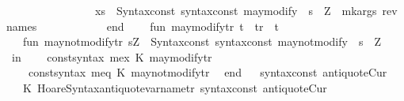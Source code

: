 \begin{isabellebody}
\ \ \ \ \ \ \ \ \ \ \ \ \ \ \ \ {\isacharbar}\ xs\ {\isacharequal}{\isachargreater}\ Syntax{\isachardot}const\ {\isacharat}{\isacharbraceleft}syntax{\isacharunderscore}const\ {\isachardoublequote}{\isacharunderscore}may{\isacharunderscore}modify{\isachardoublequote}{\isacharbraceright}\ {\isachardollar}\ s\ {\isachardollar}\ Z\ {\isachardollar}\ mk{\isacharunderscore}args\ {\isacharparenleft}rev\ names{\isacharparenright}{\isacharparenright}\isanewline
\ \ \ \ \ \ \ \ \ \ \ \ end{\isacharsemicolon}\isanewline
\isanewline
\ \ \ \ fun\ may{\isacharunderscore}modify{\isacharunderscore}tr{\isacharprime}\ {\isacharbrackleft}t{\isacharbrackright}\ {\isacharequal}\ tr{\isacharprime}\ {\isacharbrackleft}{\isacharbrackright}\ t\isanewline
\ \ \ \ fun\ may{\isacharunderscore}not{\isacharunderscore}modify{\isacharunderscore}tr{\isacharprime}\ {\isacharbrackleft}{\isacharunderscore}{\isachardollar}s{\isacharcomma}{\isacharunderscore}{\isachardollar}Z{\isacharbrackright}\ {\isacharequal}\ Syntax{\isachardot}const\ {\isacharat}{\isacharbraceleft}syntax{\isacharunderscore}const\ {\isachardoublequote}{\isacharunderscore}may{\isacharunderscore}not{\isacharunderscore}modify{\isachardoublequote}{\isacharbraceright}\ {\isachardollar}\ s\ {\isachardollar}\ Z\isanewline
\ \ in\isanewline
\ \ \ \ {\isacharbrackleft}{\isacharparenleft}{\isacharat}{\isacharbraceleft}const{\isacharunderscore}syntax\ mex{\isacharbraceright}{\isacharcomma}\ K\ may{\isacharunderscore}modify{\isacharunderscore}tr{\isacharprime}{\isacharparenright}{\isacharcomma}\isanewline
\ \ \ \ \ {\isacharparenleft}{\isacharat}{\isacharbraceleft}const{\isacharunderscore}syntax\ meq{\isacharbraceright}{\isacharcomma}\ K\ may{\isacharunderscore}not{\isacharunderscore}modify{\isacharunderscore}tr{\isacharprime}{\isacharparenright}{\isacharbrackright}\isanewline
\ \ end{\isacharsemicolon}\isanewline
{\isacartoucheclose}\isanewline
\isanewline
\isanewline
\isanewline
\isanewline
\isanewline
\isanewline
\isanewline
{}\isamarkupfalse%
\ {\isacartoucheopen}\isanewline
\ {\isacharbrackleft}{\isacharparenleft}{\isacharat}{\isacharbraceleft}syntax{\isacharunderscore}const\ {\isachardoublequote}{\isacharunderscore}antiquoteCur{\isachardoublequote}{\isacharbraceright}{\isacharcomma}\isanewline
\ \ \ \ K\ {\isacharparenleft}Hoare{\isacharunderscore}Syntax{\isachardot}antiquote{\isacharunderscore}varname{\isacharunderscore}tr\ {\isacharat}{\isacharbraceleft}syntax{\isacharunderscore}const\ {\isachardoublequote}{\isacharunderscore}antiquoteCur{\isachardoublequote}{\isacharbraceright}{\isacharparenright}{\isacharparenright}{\isacharbrackright}\isanewline

\end{isabellebody}
